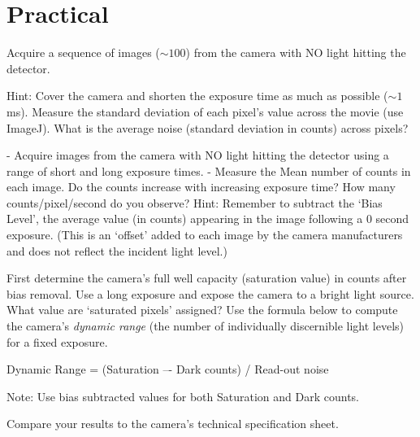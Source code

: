 \documentclass[a4paper]{report}
\newcommand{\nexercise}[0]{\arabic{exercises}\addtocounter{exercises}{1}}
\begin{document}
\section{Practical}
\begin{exercisebox}[frametitle={Exercise \nexercise: Measure read-out noise}]
Acquire a sequence of images ($\sim100$) from the camera with NO light hitting the detector. 

Hint: Cover the camera and shorten the exposure time as much as possible ($\sim1$ ms). Measure the standard deviation of each pixel’s value across the movie (use ImageJ). 
What is the average noise (standard deviation in counts) across pixels? 
\end{exercisebox}

\begin{exercisebox}[frametitle={Exercise \nexercise: Measure dark counts}]
- Acquire images from the camera with NO light hitting the detector using a range of short and long exposure times.
- Measure the Mean number of counts in each image. Do the counts increase with increasing exposure time? How many counts/pixel/second do you observe? 
Hint: Remember to subtract the ‘Bias Level’, the average value (in counts) appearing in the image following a 0 second exposure. (This is an ‘offset’ added to each image by the camera manufacturers and does not reflect the incident light level.) 
\end{exercisebox}

\begin{exercisebox}[frametitle={Exercise \nexercise: Compute the dynamic range of the camera}]
First determine the camera’s full well capacity (saturation value) in counts after bias removal. 
Use a long exposure and expose the camera to a bright light source. What value are ‘saturated pixels’ assigned? 
Use the formula below to compute the camera’s \textit{dynamic range} (the number of individually discernible light levels) for a fixed exposure. 
\begin{center}
Dynamic Range = (Saturation –- Dark counts) / Read-out noise
\end{center}

Note: Use bias subtracted values for both Saturation and Dark counts.

Compare your results to the camera’s technical specification sheet. 
\end{exercisebox}
\end{document}
